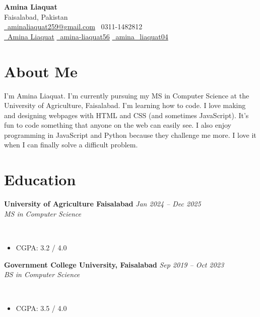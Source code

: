 \documentclass[a4paper,11pt]{article}
\newcommand{\twocolentry}[2]{
    \noindent\textbf{#2} \hfill \textit{#1}
}
\newcommand{\onecolentry}[1]{
    \noindent #1 \par
}
\newenvironment{highlights}{
    \begin{itemize}[leftmargin=1.5em]
}{
    \end{itemize}
}
\begin{document}
\begin{center}
    {\LARGE \textbf{Amina Liaquat}}\\
    \vspace{0.3cm}
    Faisalabad, Pakistan \\
    \vspace{0.2cm}
    \href{mailto:aminaliaquat259@gmail.com}{\faEnvelope\ aminaliaquat259@gmail.com} \quad
    \faPhone\ 0311-1482812 \\
    \href{https://www.linkedin.com/in/amina-liaquat}{\faLinkedin\ Amina Liaquat} \quad
    \href{https://github.com/amina-liaquat56}{\faGithub\ amina-liaquat56} \quad
    \href{https://leetcode.com/u/amina_liaquat04/}{\faCode\ amina\_liaquat04}
\end{center}

\vspace{0.4cm}

\section*{About Me}
\onecolentry{
I'm Amina Liaquat. I'm currently pursuing my MS in Computer Science at the University of Agriculture, Faisalabad. I'm learning how to code. I love making and designing webpages with HTML and CSS (and sometimes JavaScript). It's fun to code something that anyone on the web can easily see. I also enjoy programming in JavaScript and Python because they challenge me more. I love it when I can finally solve a difficult problem.
}

\section*{Education}

\twocolentry{Jan 2024 – Dec 2025}{University of Agriculture Faisalabad}\\
\onecolentry{\textit{MS in Computer Science}}\\
\begin{highlights}
    \item CGPA: 3.2 / 4.0
\end{highlights}

\twocolentry{Sep 2019 – Oct 2023}{Government College University, Faisalabad}\\
\onecolentry{\textit{BS in Computer Science}}\\
\begin{highlights}
    \item CGPA: 3.5 / 4.0
\end{highlights}
\end{document}
